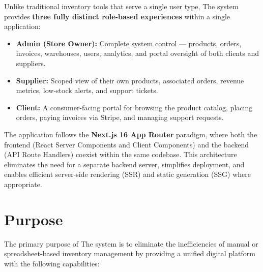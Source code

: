﻿\documentclass[12pt,a4paper]{report}
\begin{document}
\begin{tcolorbox}[infobox,title={Three-Role Architecture}]
Unlike traditional inventory tools that serve a single user type, The system provides \textbf{three fully distinct role-based experiences} within a single application:
\begin{itemize}[leftmargin=1.5em]
  \item \textbf{Admin (Store Owner):} Complete system control --- products, orders, invoices, warehouses, users, analytics, and portal oversight of both clients and suppliers.
  \item \textbf{Supplier:} Scoped view of their own products, associated orders, revenue metrics, low-stock alerts, and support tickets.
  \item \textbf{Client:} A consumer-facing portal for browsing the product catalog, placing orders, paying invoices via Stripe, and managing support requests.
\end{itemize}
\end{tcolorbox}

The application follows the \textbf{Next.js 16 App Router} paradigm, where both the frontend (React Server Components and Client Components) and the backend (API Route Handlers) coexist within the same codebase. This architecture eliminates the need for a separate backend server, simplifies deployment, and enables efficient server-side rendering (SSR) and static generation (SSG) where appropriate.

\section{Purpose}

The primary purpose of The system is to eliminate the inefficiencies of manual or spreadsheet-based inventory management by providing a unified digital platform with the following capabilities:
\end{document}
